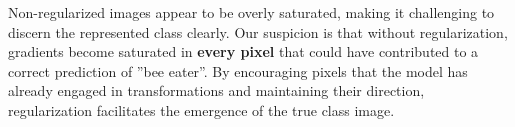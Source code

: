
Non-regularized images appear to be overly saturated, making it challenging to discern the represented class clearly. Our suspicion is that without regularization, gradients become saturated in \textbf{every pixel} that could have contributed to a correct prediction of ''bee eater''. By encouraging pixels that the model has already engaged in transformations and maintaining their direction, regularization facilitates the emergence of the true class image.

